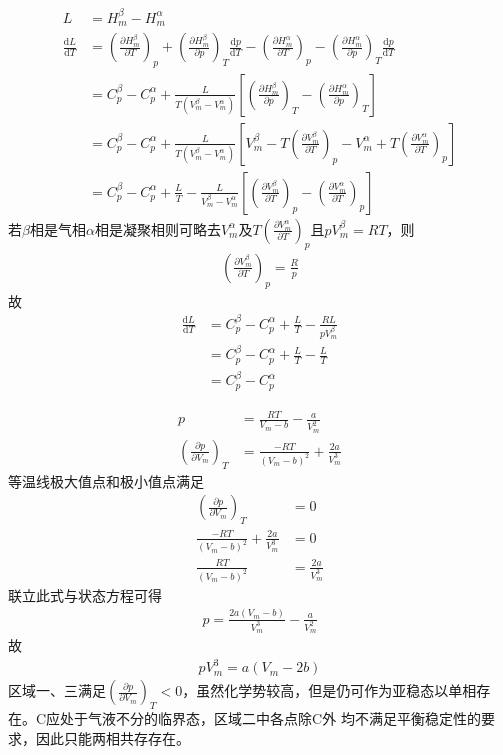 \documentclass{phyasgn}
\renewcommand{\d}{\mathrm{d}}
\begin{document}
\begin{sol}[6]
    \begin{align*}
        L&=H_m^\beta-H_m^\alpha\\
        \frac{\d L}{\d T}&=(\frac{\partial H_m^\beta}{\partial T})_p+(\frac{\partial H_m^\beta}{\partial p})_T\frac{\d p}{\d T}-(\frac{\partial H_m^\alpha}{\partial T})_p-(\frac{\partial H_m^\alpha}{\partial p})_T\frac{\d p}{\d T}\\
        &=C_p^\beta-C_p^\alpha+\frac{L}{T(V_m^\beta-V_m^\alpha)}\left[(\frac{\partial H_m^\beta}{\partial p})_T-(\frac{\partial H_m^\alpha}{\partial p})_T\right]\\
        &=C_p^\beta-C_p^\alpha+\frac{L}{T(V_m^\beta-V_m^\alpha)}\left[V_m^\beta-T(\frac{\partial V_m^\beta}{\partial T})_p-V_m^\alpha+T(\frac{\partial V_m^\alpha}{\partial T})_p\right]\\
        &=C_p^\beta-C_p^\alpha+\frac{L}{T}-\frac{L}{V_m^\beta-V_m^\alpha}\left[(\frac{\partial V_m^\beta}{\partial T})_p-(\frac{\partial V_m^\alpha}{\partial T})_p\right]
    \end{align*}
    若$\beta$相是气相$\alpha$相是凝聚相则可略去$V_m^\alpha$及$T(\frac{\partial V_m^\alpha}{\partial T})_p$且$pV_m^\beta=RT$，则
    \begin{align*}
        (\frac{\partial V_m^\beta}{\partial T})_p=\frac{R}{p}
    \end{align*}
    故
    \begin{align*}
        \frac{\d L}{\d T}&=C_p^\beta-C_p^\alpha+\frac{L}{T}-\frac{RL}{pV_m^\beta}\\
        &=C_p^\beta-C_p^\alpha+\frac{L}{T}-\frac{L}{T}\\
        &=C_p^\beta-C_p^\alpha
    \end{align*}
\end{sol}\par

\begin{sol}[7]
    \begin{align*}
        p&=\frac{RT}{V_m-b}-\frac{a}{V_m^2}\\
        (\frac{\partial p}{\partial V_m})_T&=\frac{-RT}{(V_m-b)^2}+\frac{2a}{V_m^3}
    \end{align*}
    等温线极大值点和极小值点满足
    \begin{align*}
        (\frac{\partial p}{\partial V_m})_T&=0\\
        \frac{-RT}{(V_m-b)^2}+\frac{2a}{V_m^3}&=0\\
        \frac{RT}{(V_m-b)^2}&=\frac{2a}{V_m^3}
    \end{align*}
    联立此式与状态方程可得
    \begin{align*}
        p=\frac{2a(V_m-b)}{V_m^3}-\frac{a}{V_m^2}
    \end{align*}
    故
    \begin{align*}
        pV_m^3=a(V_m-2b)
    \end{align*}
    区域一、三满足$(\frac{\partial p}{\partial V_m})_T<0$，虽然化学势较高，但是仍可作为亚稳态以单相存在。C应处于气液不分的临界态，区域二中各点除C外
    均不满足平衡稳定性的要求，因此只能两相共存存在。
\end{sol}\par
\end{document}
